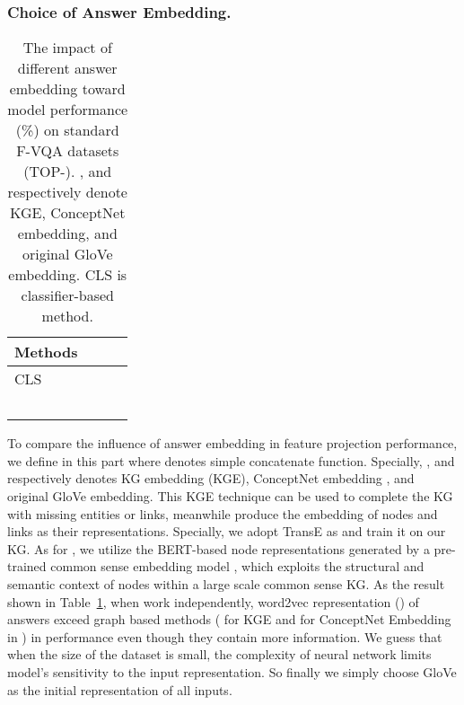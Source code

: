 \documentclass[runningheads]{llncs}
\begin{document}
\subsubsection{Choice of Answer Embedding.}
\setlength{\tabcolsep}{8pt}
\begin{table}[htbp]
\scriptsize
\caption{The impact of different answer embedding toward model performance (\%) on standard F-VQA datasets (TOP-). ,  and  respectively denote KGE,  ConceptNet embedding, and original GloVe embedding. CLS is classifier-based method.}
\label{tab:Answer Embedding Ablation}
\centering
\begin{tabular}{l|ccc}
 \toprule
\multirow{1}{*}{{\bf \quad   Methods }}                        
& {\bf }
& 
& 
\\ 
 \midrule
\quad CLS &   &    &    \\			 	
\quad  &   &    &    \\			 	
\quad  &   &    &    \\ 			 	
\quad  &   &    &    \\ 	
\quad  &   &    &    \\ 			 	
\quad  &   &    &    \\ 			 	
\bottomrule 
\end{tabular}
\end{table}
To compare the influence of answer embedding in feature projection performance, we define  in this part where  denotes simple concatenate function. Specially, ,  and  respectively denotes KG embedding (KGE),  ConceptNet embedding \cite{DBLP:conf/aaai/MalaviyaBBC20}, and original GloVe embedding. 
This KGE technique can be used to complete the KG with missing entities or links, meanwhile produce the embedding of nodes and links as their representations. 
Specially, we adopt TransE \cite{DBLP:conf/nips/BordesUGWY13} as  and train it on our KG. 
As for , we utilize the BERT-based node representations generated by a pre-trained common sense embedding model \cite{DBLP:conf/aaai/MalaviyaBBC20}, which exploits the structural and semantic context of nodes within a large scale common sense KG.
As the result shown in Table~\ref{tab:Answer Embedding Ablation}, when work independently, word2vec representation () of answers exceed graph based methods (  for KGE and  for ConceptNet Embedding in  ) in performance even though they contain more information. 
We guess that when the size of the dataset is small, the complexity of neural network limits model's sensitivity to the input representation. So finally we simply choose GloVe as the initial representation of all inputs.
\end{document}
